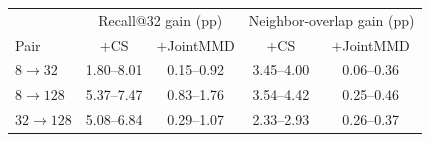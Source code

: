 \begin{tabular}{lcccc}
\toprule
 & \multicolumn{2}{c}{Recall@32 gain (pp)} & \multicolumn{2}{c}{Neighbor-overlap gain (pp)} \\
Pair & $+$CS & $+$JointMMD & $+$CS & $+$JointMMD \\
\midrule
$8\to 32$ & 1.80--8.01 & 0.15--0.92 & 3.45--4.00 & 0.06--0.36 \\
$8\to 128$ & 5.37--7.47 & 0.83--1.76 & 3.54--4.42 & 0.25--0.46 \\
$32\to 128$ & 5.08--6.84 & 0.29--1.07 & 2.33--2.93 & 0.26--0.37 \\
\bottomrule
\end{tabular}
